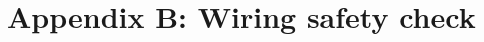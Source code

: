      \chapter{Appendix B: Wiring safety check}
     \vspace{-15mm}
     \begin{figure}[!htb]
     \centering
	\label{fig:plugSafety}
	\end{figure}